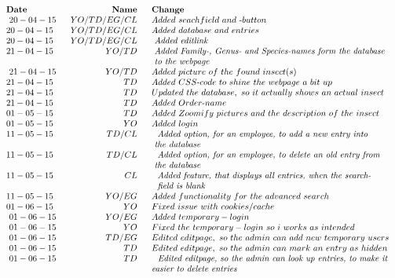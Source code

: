 \documentclass[12pt,a4paper]{article}
\begin{document}
	$$
	\begin{array}{lrl}
	\bf{Date}~&~\bf{Name}~&~\bf{Change}~\\~
	20-04-15~&~YO/TD/EG/CL~&~Added~seachfield~and~\text{-}button~\\
	20-04-15~&~YO/TD/EG/CL~&~Added~database~and~entries~\\
	20-04-15~&~YO/TD/EG/CL~&~\vtop{\hbox{\strut~\emph{Added~edit\-link}}}~\\
	21-04-15~&~YO/TD~&~\vtop{\hbox{\strut~\emph{Added~Family\text{-},~Genus\text{-}~and~Species\text{-}names~form~the~database}}\hbox{\strut~\emph{to~the~webpage}}}~~\\~
	21-04-15~&~YO/TD~&~Added~picture~of~the~found~insect(s)~\\
	21-04-15~&~TD~&~Added~CSS\text{-}code~to~shine~the~webpage~a~bit~up~\\
	21-04-15~&~TD~&~Updated~the~database,~so~it~actually~shows~an~actual~insect\\
	21-04-15~&~TD~&~Added~Order\text{-}name\\
	01-05-15~&~TD~&~Added~Zoomify~pictures~and~the~description~of~the~insect\\
	01-05-15~&~YO~&~Added~login\\
	11-05-15~&~TD/CL~&~\vtop{\hbox{\strut~\emph{	Added~option,~for~an~employee,~to~add~a~new~entry~into~}}\hbox{\strut~\emph{the~database}}}~\\
	11-05-15~&~TD/CL~&~\vtop{\hbox{\strut~\emph{	Added~option,~for~an~employee,~to~delete~an~old~entry~from}}\hbox{\strut~\emph{the~database}}}~\\
	11-05-15~&~CL~&~\vtop{\hbox{\strut~\emph{	Added~feature,~that~displays~all~entries,~when~the~search\text{-}}}\hbox{\strut~\emph{~field~is~blank}}}\\
	11-05-15~&~YO/EG~&~Added~functionality~for~the~advanced~search\\
	01-06-15~&~YO~&~Fixed~issue~with~cookies/cache~\\~
	01-06-15~&~YO/EG~&~Added~temporary-login~\\~
	01-06-15~&~YO~&~Fixed~the~temporary-login~so~i~works~as~intended~\\~
	01-06-15~&~TD/EG~&~Edited~editpage,~so~the~admin~can~add~new~temporary~users~\\~
	01-06-15~&~TD~&~Edited~editpage,~so~the~admin~can~mark~an~entry~as~hidden~\\~
	01-06-15~&~TD~&\vtop{\hbox{\strut~\emph{	~Edited~editpage,~so~the~admin~can~look~up~entries,~to~make~it~}}\hbox{\strut~\emph{easier~to~delete~entries}}}
	\end{array}
	$$
\end{document}
